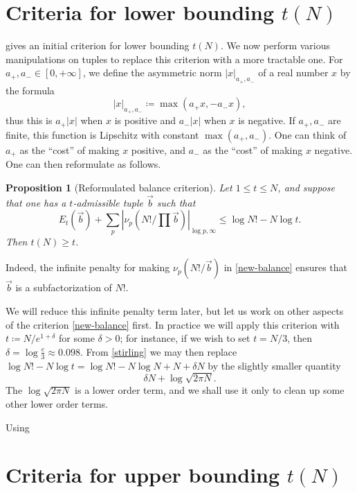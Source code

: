 \documentclass[12pt,a4paper,reqno]{amsart}
\numberwithin{equation}{section}
\theoremstyle{plain}
\newtheorem{proposition}[theorem]{Proposition}
\theoremstyle{definition}
\begin{document}
\section{Criteria for lower bounding \texorpdfstring{$t(N)$}{t(N)}}

 gives an initial criterion for lower bounding $t(N)$.  We now perform various manipulations on tuples to replace this criterion with a more tractable one.
For $a_+,a_- \in [0,+\infty]$, we define the asymmetric norm $|x|_{a_+,a_-}$ of a real number $x$ by the formula
$$ |x|_{a_+,a_-} \coloneqq \max(a_+ x, -a_- x),$$
thus this is $a_+ |x|$ when $x$ is positive and $a_- |x|$ when $x$ is negative.  If $a_+,a_-$ are finite, this function is Lipschitz with constant $\max(a_+,a_-)$.  One can think of $a_+$ as the ``cost'' of making $x$ positive, and $a_-$ as the
``cost'' of making $x$ negative.  One can then reformulate  as follows.

\begin{proposition}[Reformulated balance criterion]\label{balance-reform}  Let $1 \leq t \leq N$, and suppose that one has a $t$-admissible tuple $\vec b$ such that
\begin{equation}\label{new-balance}
    E_t(\vec b) + \sum_p |\nu_p(N!/\prod \vec b)|_{\log p,\infty} \leq \log N! - N \log t.
\end{equation}
Then $t(N) \geq t$.
\end{proposition}

Indeed, the infinite penalty for making $\nu_p(N!/\vec b)$ in \eqref{new-balance} ensures that $\vec b$ is a subfactorization of $N!$.

We will reduce this infinite penalty term later, but let us work on other aspects of the criterion \eqref{new-balance} first.  In practice we will apply this criterion with $t \coloneqq N / e^{1+\delta}$ for some $\delta>0$; for instance, if we wish to set $t = N/3$, then $\delta = \log \frac{e}{3} \approx 0.098$.  From \eqref{stirling} we may then replace $\log N! - N \log t = \log N! - N \log N + N + \delta N$ by the slightly smaller quantity
$$ \delta N + \log \sqrt{2\pi N}.$$
The $\log \sqrt{2\pi N}$ is a lower order term, and we shall use it only to clean up some other lower order terms.

Using 


\section{Criteria for upper bounding \texorpdfstring{$t(N)$}{t(N)}}
\end{document}
